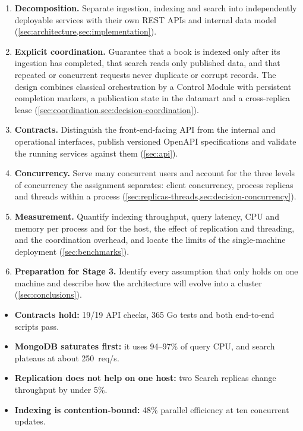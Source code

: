 \documentclass[10pt,a4paper]{article}
\newcommand{\fixed}[1]{#1}
\begin{document}
\begin{enumerate}[label=\textbf{O\arabic*}, leftmargin=2.2em]
  \item \textbf{Decomposition.} Separate ingestion, indexing and search into
  independently deployable services with their own REST APIs and internal data
  model (\cref{sec:architecture,sec:implementation}).
  \item \textbf{Explicit coordination.} Guarantee that a book is indexed only
  after its ingestion has completed, that search reads only published data,
  and that repeated or concurrent requests never duplicate or corrupt records.
  The design combines classical orchestration by a Control Module with
  persistent completion markers, a publication state in the datamart and a
  cross-replica lease (\cref{sec:coordination,sec:decision-coordination}).
  \item \textbf{Contracts.} Distinguish the front-end-facing API from the
  internal and operational interfaces, publish versioned OpenAPI
  specifications and validate the running services against them
  (\cref{sec:api}).
  \item \textbf{Concurrency.} Serve many concurrent users and account for the
  three levels of concurrency the assignment separates: client concurrency,
  process replicas and threads within a process
  (\cref{sec:replicas-threads,sec:decision-concurrency}).
  \item \textbf{Measurement.} Quantify indexing throughput, query latency,
  CPU and memory per process and for the host, the effect of replication and
  threading, and the coordination overhead, and locate the limits of the
  single-machine deployment (\cref{sec:benchmarks}).
  \item \textbf{Preparation for Stage 3.} Identify every assumption that only
  holds on one machine and describe how the architecture will evolve into a
  cluster (\cref{sec:conclusions}).
\end{enumerate}

\begin{keyresults}
\begin{itemize}[leftmargin=1.2em]
  \item \textbf{Contracts hold:} \fixed{19}/\fixed{19} API checks, \fixed{365}
  Go tests and both end-to-end scripts pass.
  \item \textbf{MongoDB saturates first:} it uses 94--97\% of query CPU, and
  search plateaus at about 250~req/s.
  \item \textbf{Replication does not help on one host:} two Search replicas
  change throughput by under 5\%.
  \item \textbf{Indexing is contention-bound:} 48\% parallel efficiency at ten
  concurrent updates.
\end{itemize}
\end{keyresults}
\end{document}
